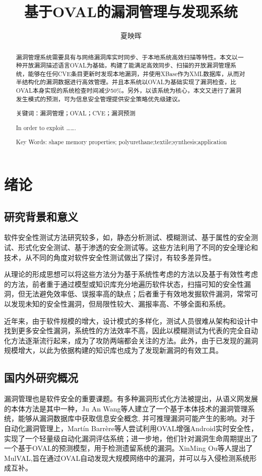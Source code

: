 \documentclass[a4paper]{ctexrep}
\title{基于OVAL的漏洞管理与发现系统}
\author{夏映晖}
\date{}
\begin{document}
	\maketitle
	\begin{abstract}
	漏洞管理系统需要具有与网络漏洞库实时同步、于本地系统高效扫描等特性。本文以一种开放漏洞描述语言OVAL为基础，构建了能满足高效同步、扫描的开放漏洞管理系统，能够在任何CVE条目更新时发现本地漏洞，并使用XBase作为XML数据库，从而对半结构化的漏洞数据进行高效管理。并且本系统以OVAL为基础实现了漏洞检查，比OVAL本身实现的系统检查时间减少50\%。另外，以该系统为核心，本文又进行了漏洞发生模式的预测，可为信息安全管理提供安全策略优先级建议。
	
	关键词：漏洞管理；OVAL；CVE；漏洞预测
	\end{abstract}
	\renewcommand\abstractname{abstract}
	\begin{abstract}
	In order to exploit …….
	
	Key Words: shape memory properties; polyurethane;textile;synthesis;application
	\end{abstract}
	\tableofcontents
	\newpage
	\setcounter{page}{1}
	\chapter{绪论}
		\section{研究背景和意义}
		软件安全性测试方法研究较多，如，静态分析测试\cite{钟永松2007基于}、模糊测试、基于属性的安全测试、形式化安全测试、基于渗透的安全测试等。这些方法利用了不同的安全理论和技术，从不同的角度对软件安全性测试做出了探讨，有较多差异性。
		
		从理论的形成思想可以将这些方法分为基于系统性考虑的方法以及基于有效性考虑的方法，前者重于通过模型或知识库充分地遍历软件状态，扫描可知的安全性漏洞，但无法避免效率低、误报率高的缺点；后者重于有效地发掘软件漏洞，常常可以发现未知的安全性漏洞，但局限性较大、漏报率高、不够全面和系统。

		近年来，由于软件规模的增大，设计模式的多样化，测试人员很难从架构和设计中找到更多安全性漏洞，系统性的方法效率不高，因此以模糊测试为代表的完全自动化方法逐渐流行起来，成为了攻防两端都会关注的方法。此外，由于已发现的漏洞规模增大，以此为依据构建的知识库也成为了发现新漏洞的有效工具。
		\section{国内外研究概况} 
		漏洞管理也是软件安全的重要课题。有多种漏洞形式化方法被提出，从语义网发展的本体方法是其中一种，Ju An Wang\cite{morishita1992activation}等人建立了一个基于本体技术的漏洞管理系统，能够从漏洞数据库中获取信息安全概念, 并可推理漏洞可能产生的影响。对于自动化漏洞管理上，Martín Barrère等人尝试利用OVAL增强Android实时安全性，实现了一个轻量级自动化漏洞评估系统；进一步地，他们针对漏洞生命周期提出了一个基于OVAL的预测模型，用于检测遗留系统的漏洞。XinMing Ou等人提出了MulVAL,旨在通过OVAL自动发现大规模网络中的漏洞，并可以与入侵检测系统形成互补。
\end{document}
